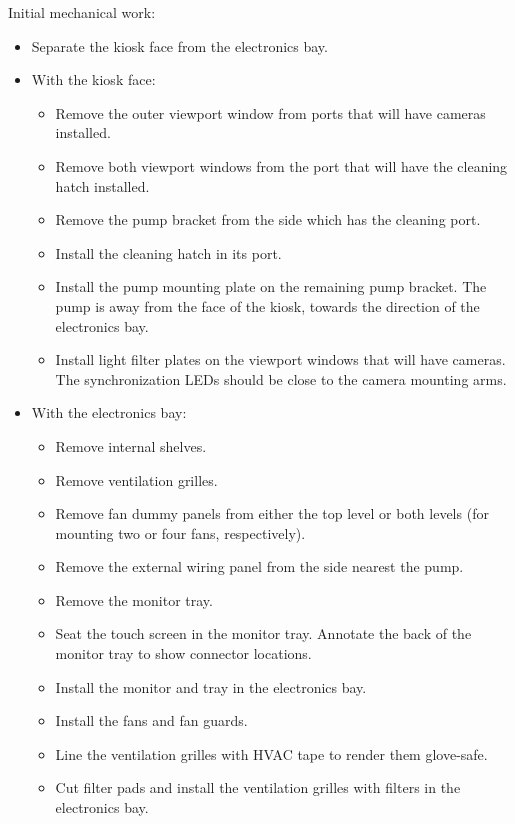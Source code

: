 Initial mechanical work:
\begin{itemize}
\item Separate the kiosk face from the electronics bay.
\item With the kiosk face:
\begin{itemize}
\item Remove the outer viewport window from ports that will have cameras
installed.
\item Remove both viewport windows from the port that will have the
cleaning hatch installed.
\item Remove the pump bracket from the side which has the cleaning port.
\item Install the cleaning hatch in its port.
\item Install the pump mounting plate on the remaining pump bracket. The pump
is away from the face of the kiosk, towards the direction of the electronics
bay.
\item Install light filter plates on the viewport windows that will have
cameras. The synchronization LEDs should be close to the camera mounting
arms.
\end{itemize}
\item With the electronics bay:
\begin{itemize}
\item Remove internal shelves.
\item Remove ventilation grilles.
\item Remove fan dummy panels from either the top level or both levels
(for mounting two or four fans, respectively).
\item Remove the external wiring panel from the side nearest the pump.
\item Remove the monitor tray.
\item Seat the touch screen in the monitor tray. Annotate the back of the
monitor tray to show connector locations.
\item Install the monitor and tray in the electronics bay.
\item Install the fans and fan guards.
\item Line the ventilation grilles with HVAC tape to render them glove-safe.
\item Cut filter pads and install the ventilation grilles with filters in
the electronics bay.
\end{itemize}
\end{itemize}


